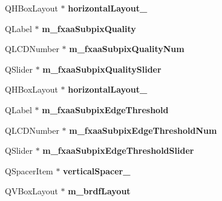 \begin{DoxyCompactItemize}
\item 
\hypertarget{classUi__MainWindow_a14c9d4842c3e97e16e7873ef0aecdb1e}{Q\-H\-Box\-Layout $\ast$ {\bfseries horizontal\-Layout\-\_}}\label{classUi__MainWindow_a14c9d4842c3e97e16e7873ef0aecdb1e}

\item 
\hypertarget{classUi__MainWindow_a306e98b848367bb675a3ed27efd9df55}{Q\-Label $\ast$ {\bfseries m\-\_\-fxaa\-Subpix\-Quality}}\label{classUi__MainWindow_a306e98b848367bb675a3ed27efd9df55}

\item 
\hypertarget{classUi__MainWindow_ab4f7e47f5f8b632322225e9c5aecba2b}{Q\-L\-C\-D\-Number $\ast$ {\bfseries m\-\_\-fxaa\-Subpix\-Quality\-Num}}\label{classUi__MainWindow_ab4f7e47f5f8b632322225e9c5aecba2b}

\item 
\hypertarget{classUi__MainWindow_a05ca585a3baa5ad33223afbc88cadebe}{Q\-Slider $\ast$ {\bfseries m\-\_\-fxaa\-Subpix\-Quality\-Slider}}\label{classUi__MainWindow_a05ca585a3baa5ad33223afbc88cadebe}

\item 
\hypertarget{classUi__MainWindow_a1351e317cba7ca711b6b4d2212b6bf36}{Q\-H\-Box\-Layout $\ast$ {\bfseries horizontal\-Layout\-\_}}\label{classUi__MainWindow_a1351e317cba7ca711b6b4d2212b6bf36}

\item 
\hypertarget{classUi__MainWindow_ae68626f7f047952fb9a419c6c6a990df}{Q\-Label $\ast$ {\bfseries m\-\_\-fxaa\-Subpix\-Edge\-Threshold}}\label{classUi__MainWindow_ae68626f7f047952fb9a419c6c6a990df}

\item 
\hypertarget{classUi__MainWindow_a3c513b6b113fc3a1c8ac6206ebc200ce}{Q\-L\-C\-D\-Number $\ast$ {\bfseries m\-\_\-fxaa\-Subpix\-Edge\-Threshold\-Num}}\label{classUi__MainWindow_a3c513b6b113fc3a1c8ac6206ebc200ce}

\item 
\hypertarget{classUi__MainWindow_a1b88203c84c812285f8653ff5d7a845d}{Q\-Slider $\ast$ {\bfseries m\-\_\-fxaa\-Subpix\-Edge\-Threshold\-Slider}}\label{classUi__MainWindow_a1b88203c84c812285f8653ff5d7a845d}

\item 
\hypertarget{classUi__MainWindow_a9d4bfb2fa0d87ccf9f7a311116676be6}{Q\-Spacer\-Item $\ast$ {\bfseries vertical\-Spacer\-\_}}\label{classUi__MainWindow_a9d4bfb2fa0d87ccf9f7a311116676be6}

\item 
\hypertarget{classUi__MainWindow_a0d1d3c1bf1f475b5854e6344c86bed22}{Q\-V\-Box\-Layout $\ast$ {\bfseries m\-\_\-brdf\-Layout}}\label{classUi__MainWindow_a0d1d3c1bf1f475b5854e6344c86bed22}


\end{DoxyCompactItemize}
